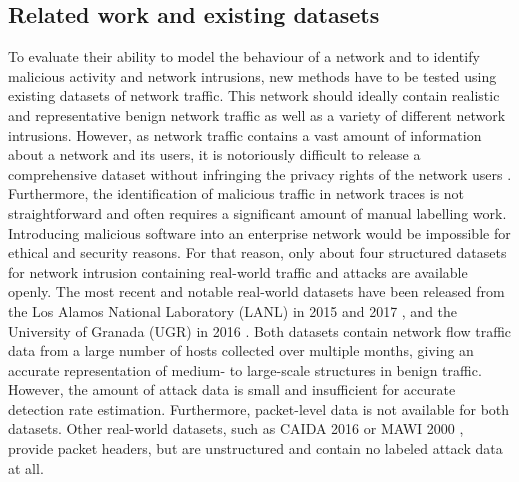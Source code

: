 


\subsection{Related work and existing datasets}

To evaluate their ability to model the behaviour of a network and to identify malicious activity and network intrusions, new methods have to be tested using existing datasets of network traffic. This network should ideally contain realistic and representative benign network traffic as well as a variety of different network intrusions. However, as network traffic contains a vast amount of information about a network and its users, it is notoriously difficult to release a comprehensive dataset without infringing the privacy rights of the network users \cite{sperotto2009labeled}. Furthermore, the identification of malicious traffic in network traces is not straightforward and often requires a significant amount of manual labelling work. Introducing malicious software into an enterprise network would be impossible for ethical and security reasons. For that reason, only about four structured datasets for network intrusion containing real-world traffic and attacks are available openly. The most recent and notable real-world datasets have been released from the Los Alamos National Laboratory (LANL) in 2015 and 2017 \cite{akent-2015-enterprise-data, turcotte17}, and the University of Granada (UGR) in 2016 \cite{macia2018ugr}. Both datasets contain network flow traffic data from a large number of hosts collected over multiple months, giving an accurate representation of medium- to large-scale structures in benign traffic. However, the amount of attack data is small and insufficient for accurate detection rate estimation. Furthermore, packet-level data is not available for both datasets. Other real-world datasets, such as CAIDA 2016 \cite{walsworth2015caida} or MAWI 2000 \cite{sony2000traffic}, provide packet headers, but are unstructured and contain no labeled attack data at all.

